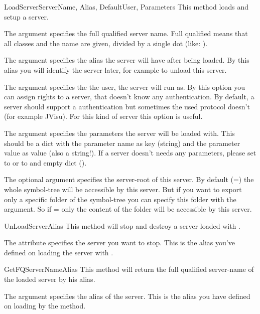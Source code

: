 \begin{methoddesc}[System]{LoadServer}{ServerName, Alias, DefaultUser, Parameters}
This method loads and setup a server. 

The argument  specifies the full qualified server name. Full 
qualified means that all classes and the name are given, divided by a single 
dot (like: ).

The argument  specifies the alias the server will have after 
being loaded. By this alias you will identify the server later, for example 
to unload this server.

The argument  specifies the the user, the server will run as. 
By this option you can assign rights to a server, that doesn't know any 
authentication. By default, a server should support a authentication but 
sometimes the used protocol doesn't (for example JVisu). For this kind of 
server this option is useful.

The argument  specifies the parameters the server will be 
loaded with. This should be a dict with the parameter name as key (string)
and the parameter value as value (also a string!). If a server doesn't needs
any parameters, please set  to  or to and empty 
dict (\code{\{\}}). 

The optional argument  specifies the server-root of this server. 
By default (=) the whole symbol-tree will be accessible
by this server. But if you want to export only a specific folder of the 
symbol-tree you can specify this folder with the  argument. So
if = only the content of the folder 
will be accessible by this server.
\end{methoddesc}


\begin{methoddesc}[System]{UnLoadServer}{Alias}
This method will stop and destroy a server loaded with .

The attribute  specifies the server you want to stop. This is the 
alias you've defined on loading the server with .
\end{methoddesc}


\begin{methoddesc}[System]{GetFQServerName}{Alias}
This method will return the full qualified server-name of the loaded server
by his alias. 

The argument  specifies the alias of the server. This is the alias
you have defined on loading by the  method.
\end{methoddesc}


